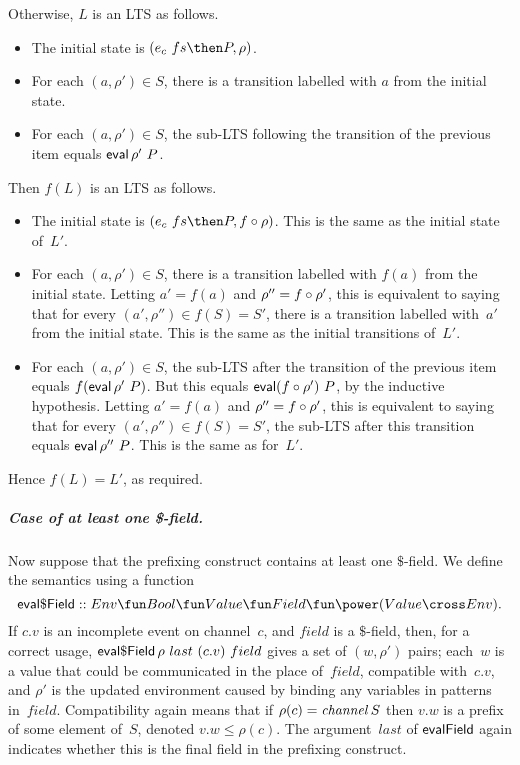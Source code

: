 Otherwise, $L$ is an LTS as follows.
%
\begin{itemize}
\item The initial state is $(e_c~ fs \then P, \rho)$.

\item For each $(a, \rho') \in S$, there is a transition labelled with $a$
  from the initial state.  %

\item For each $(a, \rho') \in S$, the sub-LTS following the transition of
  the previous item equals $\mathop{\sf eval} \rho'~ P$.
\end{itemize}
%
Then $f(L)$ is an  LTS as follows.
%
\begin{itemize}
\item The initial state is $(e_c~fs \then P, f\after\rho)$.
  This is the same as the initial state of~$L'$.

\item For each $(a, \rho') \in S$, there is a transition labelled with $f(a)$
  from the initial state.  Letting $a' = f(a)$ and $\rho'' = f\circ\rho'$,
  this is equivalent to saying that for every $(a',\rho'') \in f(S) = S'$,
  there is a transition labelled with~$a'$ from the initial state.  This is
  the same as the initial transitions of~$L'$.

\item For each $(a, \rho') \in S$, the sub-LTS after the transition of the
  previous item equals $f(\mathop{\sf eval} \rho'~ P)$.  But this equals $\mathop{\sf eval}
  (f\circ\rho')~P$, by the inductive hypothesis.  Letting $a' = f(a)$ and
  $\rho'' = f\circ\rho'$, this is equivalent to saying that for every
  $(a',\rho'') \in f(S) = S'$, the sub-LTS after this transition equals $\mathop{\sf eval}
  \rho''~P$.  This is the same as for~$L'$.
\end{itemize} 
%
Hence $f(L) = L'$, as required. 


\subparagraph{Case of at least one \$-field.}

Now suppose that the prefixing construct contains at least one $\$$-field.
We define the semantics using a function 
\[
\evalDollarField ::
  Env \fun Bool \fun Value \fun Field \fun  \power (Value \cross Env).
\]
If $c.v$ is an incomplete event on channel~$c$, and $field$ is a $\$$-field,
then, for a correct usage, $\mathop{\sf eval\$Field} \rho~last~(c.v)~field$ gives a
set of $(w,\rho')$ pairs; each~$w$ is a value that could be communicated in
the place of~$field$, compatible with~$c.v$, and $\rho'$ is the updated
environment caused by binding any variables in patterns in~$field$.
Compatibility again means that if $\rho(c) = \mathop{\it channel} S$ then $v.w$ is a
prefix of some element of~$S$, denoted $v.w \le \rho(c)$.  The argument~$last$
of $\mathop{\sf evalField}$ again indicates whether this is the final field in the
prefixing construct.

